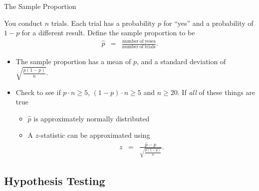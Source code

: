 \begin{frame}{The Sample Proportion}

  You conduct $n$ trials. Each trial has a probability $p$ for ``yes''
  and a probability of $1-p$ for a different result. Define the sample
  proportion to be
  \begin{eqnarray*}
    \hat{p} & = & \frac{\mathrm{number~of~yeses}}{\mathrm{number~of~trials}}.
  \end{eqnarray*}

  \begin{itemize}
  \item The sample proportion has a mean of $p$, and a standard
    deviation of $\sqrt{\frac{p(1-p)}{n}}$.
  \item Check to see if $p\cdot n \geq 5$, $(1-p)\cdot n \geq 5$ and
    $n\geq 20$. If \textit{all} of these things are true
    \begin{itemize}
    \item $\hat{p}$ is approximately normally distributed
    \item A $z$-statistic can be approximated using
      \begin{eqnarray*}
        z & = & \frac{\hat{p}-p}{\sqrt{\frac{p(1-p)}{n}}}.
      \end{eqnarray*}
    \end{itemize}

  \end{itemize}



  
\end{frame}



\subsection{Hypothesis Testing}

